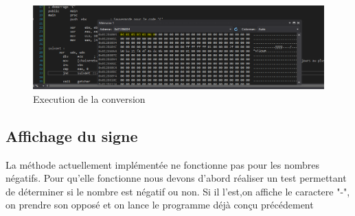 \documentclass[11pt]{report}
\begin{document}
\begin{figure}[ht]
\includegraphics[width=12cm]{Capture10.PNG}
\caption{Execution de la conversion}
\end{figure}

\subsection{Affichage du signe}

La méthode actuellement implémentée ne fonctionne pas pour les nombres négatifs.
Pour qu'elle fonctionne nous devons d'abord réaliser un test permettant de
déterminer si le nombre est négatif ou non.
Si il l'est,on affiche le caractere "-", on prendre son opposé
et on lance le programme déjà conçu précédement
\end{document}
